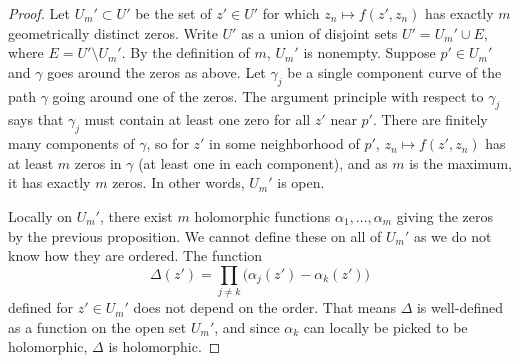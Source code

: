 \documentclass[12pt,openany]{book}
\theoremstyle{plain}
\theoremstyle{remark}
\theoremstyle{definition}
\theoremstyle{exercise}
\theoremstyle{example}
\begin{document}
\begin{proof}
Let $U_m' \subset U'$ be the set of $z' \in U'$ for which $z_n \mapsto f(z',z_n)$
has exactly $m$ geometrically distinct zeros.
Write $U'$ as a union of disjoint sets $U' = U_m' \cup E$, where $E = U'
\setminus U_m'$.
By the definition of $m$, $U_m'$ is nonempty.  Suppose $p' \in U_m'$ and $\gamma$
goes around the zeros as above.  Let $\gamma_j$ be a single component curve
of the path $\gamma$ going around one of the zeros.
The argument principle with respect to $\gamma_j$ says that
$\gamma_j$ must contain at least one zero for all $z'$ near $p'$.
There are finitely many components of $\gamma$,
so for $z'$ in some neighborhood of $p'$,
$z_n \mapsto f(z',z_n)$ has at least $m$ zeros in $\gamma$
(at least one in each component),
and as $m$ is the maximum, it has exactly $m$ zeros.
In other words, $U_m'$ is open.

Locally on $U_m'$, there exist $m$ holomorphic functions
$\alpha_1, \ldots, \alpha_m$ giving the zeros by the previous proposition.
We cannot define these on all of $U_m'$ as we do not know how they are
ordered.
The function
\begin{equation*}
\Delta(z') = \prod_{j \neq k} \bigl( \alpha_j(z') - \alpha_k(z') \bigr)
\end{equation*}
defined for $z' \in U_m'$ does not depend on the order.
That means $\Delta$ is well-defined as a function on the open set $U_m'$,
and since $\alpha_k$ can locally be picked to be holomorphic,
$\Delta$ is holomorphic.


\end{proof}
\end{document}
